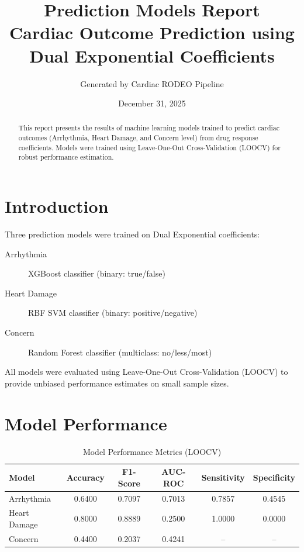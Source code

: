 \documentclass[11pt,a4paper]{article}
\title{Prediction Models Report\\
\large Cardiac Outcome Prediction using Dual Exponential Coefficients}
\author{Generated by Cardiac RODEO Pipeline}
\date{December 31, 2025}
\begin{document}
\maketitle

\begin{abstract}
This report presents the results of machine learning models trained to predict cardiac outcomes
(Arrhythmia, Heart Damage, and Concern level) from drug response coefficients.
Models were trained using Leave-One-Out Cross-Validation (LOOCV) for robust performance estimation.
\end{abstract}

\tableofcontents
\newpage

\section{Introduction}

Three prediction models were trained on Dual Exponential coefficients:

\begin{description}
    \item[Arrhythmia] XGBoost classifier (binary: true/false)
    \item[Heart Damage] RBF SVM classifier (binary: positive/negative)
    \item[Concern] Random Forest classifier (multiclass: no/less/most)
\end{description}

All models were evaluated using Leave-One-Out Cross-Validation (LOOCV) to provide
unbiased performance estimates on small sample sizes.

\section{Model Performance}


\begin{table}[htbp]
\centering
\caption{Model Performance Metrics (LOOCV)}
\label{tab:metrics}
\begin{tabular}{lccccc}
\toprule
\textbf{Model} & \textbf{Accuracy} & \textbf{F1-Score} & \textbf{AUC-ROC} & \textbf{Sensitivity} & \textbf{Specificity} \\
\midrule
Arrhythmia & 0.6400 & 0.7097 & 0.7013 & 0.7857 & 0.4545 \\
Heart Damage & 0.8000 & 0.8889 & 0.2500 & 1.0000 & 0.0000 \\
Concern & 0.4400 & 0.2037 & 0.4241 & -- & -- \\

\bottomrule
\end{tabular}
\end{table}
\end{document}
